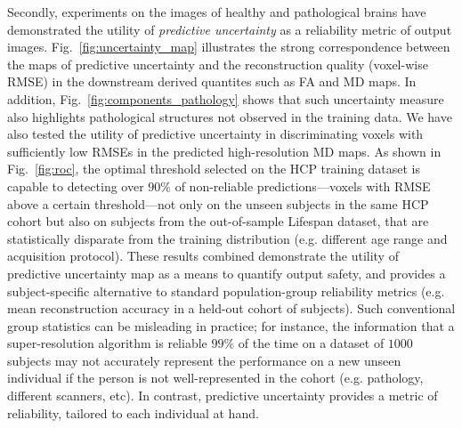  Secondly, experiments on the images of healthy and pathological brains have demonstrated the utility of \textit{predictive uncertainty} as a reliability metric of output images.  Fig.~\ref{fig:uncertainty_map} illustrates the strong correspondence between the maps of predictive uncertainty and the reconstruction quality (voxel-wise RMSE) in the downstream derived quantites such as FA and MD maps. In addition, Fig.~\ref{fig:components_pathology} shows that such uncertainty measure also highlights pathological structures not observed in the training data. We have also tested the utility of predictive uncertainty in discriminating voxels with sufficiently low RMSEs in the predicted high-resolution MD maps. As shown in Fig.~\ref{fig:roc}, the optimal threshold selected on the HCP training dataset is capable to detecting over $90\%$ of non-reliable predictions---voxels with RMSE above a certain threshold---not only on the unseen subjects in the same HCP cohort but also on subjects from the out-of-sample Lifespan dataset, that are statistically disparate from the training distribution (e.g. different age range and acquisition protocol). These results combined demonstrate the utility of predictive uncertainty map as a means to quantify output safety, and provides a subject-specific alternative to standard population-group reliability metrics (e.g. mean reconstruction accuracy in a held-out cohort of subjects). Such conventional group statistics can be misleading in practice; for instance, the information that a super-resolution algorithm is reliable $99\%$ of the time on a dataset of $1000$ subjects may not accurately represent the performance on a new unseen individual if the person is not well-represented in the cohort (e.g. pathology, different scanners, etc). In contrast, predictive uncertainty provides a metric of reliability, tailored to each individual at hand. 
 

  

